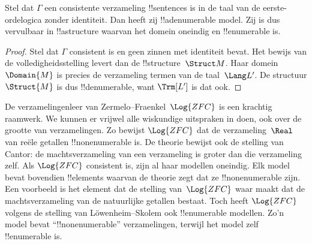 \documentclass[openany]{memoir}
\begin{document}
\begin{thm}
 Stel dat $\Gamma$ een consistente verzameling
!!{sentence}s is in de taal van de eerste-ordelogica zonder identiteit.
Dan heeft zij !!a{denumerable} model. Zij is dus vervulbaar in
!!a{structure} waarvan het domein oneindig en !!{enumerable} is.
\end{thm}

\begin{proof}
Stel dat $\Gamma$ consistent is en geen zinnen met identiteit bevat. Het
bewijs van de volledigheidsstelling levert dan de !!{structure}~$\Struct M$.
Haar domein $\Domain{M}$ is precies de verzameling termen van de
taal~$\Lang L'$. De structuur $\Struct{M}$ is dus !!{denumerable}, want
$\Trm[L']$ is dat ook.
\end{proof}

\begin{ex}
De verzamelingenleer van Zermelo--Fraenkel~$\Log{ZFC}$ is een krachtig
raamwerk. We kunnen er vrijwel alle wiskundige uitspraken in doen, ook
over de grootte van verzamelingen. Zo bewijst $\Log{ZFC}$ dat de
verzameling~$\Real$ van reële getallen !!{nonenumerable} is. De theorie
bewijst ook de stelling van Cantor: de machtsverzameling van een
verzameling is groter dan die verzameling zelf. Als $\Log{ZFC}$
consistent is, zijn al haar modellen oneindig. Elk model bevat bovendien
!!{element}s waarvan de theorie zegt dat ze !!{nonenumerable} zijn. Een
voorbeeld is het element dat de stelling van~$\Log{ZFC}$ waar maakt dat
de machtsverzameling van de natuurlijke getallen bestaat. Toch heeft
$\Log{ZFC}$ volgens de stelling van L\"owenheim--Skolem ook
!!{enumerable} modellen. Zo'n model bevat ``!!{nonenumerable}''
verzamelingen, terwijl het model zelf !!{enumerable} is.
\end{ex}
\endgroup
\OLEndChapterHook
\OLEndPartHook

\begingroup
\def\olfilename{OLP-0138}
\def\olfilepath{content/first-order-logic/}
\hypertarget{unit-OLP-0138}{}



\end{document}
